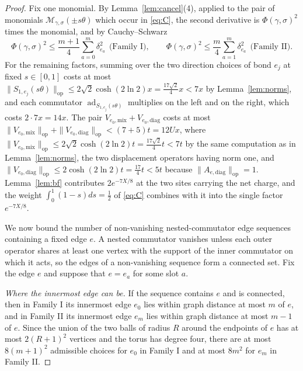 \documentclass[11pt]{article}
\theoremstyle{plain}
\theoremstyle{definition}
\newcommand{\ad}{\operatorname{ad}}
\begin{document}
\begin{proof}
Fix one monomial. By Lemma~\ref{lem:cancel}(4), applied to the pair of monomials
$\mathcal{M}_{\gamma,\sigma}(\pm s\theta)$ which occur in \eqref{eq:C}, the
second derivative is $\Phi(\gamma,\sigma)^{2}$ times the monomial, and by
Cauchy--Schwarz
\begin{equation}\label{eq:phi2}
\Phi(\gamma,\sigma)^{2}\le\frac{m+1}{4}\sum_{a=0}^{m}\delta_{e_a}^{2}
\ \ \text{(Family I)},\qquad
\Phi(\gamma,\sigma)^{2}\le\frac{m}{4}\sum_{a=1}^{m}\delta_{e_a}^{2}
\ \ \text{(Family II)} .
\end{equation}
For the remaining factors, summing over the two direction choices of bond $e_j$
at fixed $s\in[0,1]$ costs at most
$\|S_{1,e_j}(s\theta)\|_{\mathrm{op}}\le2\sqrt2\cosh(2\ln2)x=\frac{17\sqrt2}{4}x<7x$
by Lemma~\ref{lem:norms}, and each commutator $\ad_{S_{1,e_j}(s\theta)}$
multiplies on the left and on the right, which costs $2\cdot7x=14x$. The pair
$V_{e_0,\mathrm{mix}}+V_{e_0,\mathrm{diag}}$ costs at most
$\|V_{e_0,\mathrm{mix}}\|_{\mathrm{op}}+\|V_{e_0,\mathrm{diag}}\|_{\mathrm{op}}
<(7+5)t=12Ux$, where $\|V_{e_0,\mathrm{mix}}\|_{\mathrm{op}}\le2\sqrt2\cosh(2\ln2)t
=\frac{17\sqrt2}{4}t<7t$ by the same computation as in Lemma~\ref{lem:norms}, the
two displacement operators having norm one, and
$\|V_{e_0,\mathrm{diag}}\|_{\mathrm{op}}\le2\cosh(2\ln2)t=\frac{17}{4}t<5t$
because $\|A_{e,\mathrm{diag}}\|_{\mathrm{op}}=1$.
Lemma~\ref{lem:bf} contributes $2e^{-7X/8}$ at the two sites carrying the net
charge, and the weight $\int_0^{1}(1-s)ds=\frac12$ of \eqref{eq:C} combines with
it into the single factor $e^{-7X/8}$.

We now bound the number of non-vanishing nested-commutator edge sequences
containing a fixed edge $e$. A nested commutator vanishes unless each outer
operator shares at least one vertex with the support of the inner commutator on
which it acts, so the edges of a non-vanishing sequence form a connected set.
Fix the edge $e$ and suppose that $e=e_a$ for some slot $a$.

\emph{Where the innermost edge can be.} If the sequence contains $e$ and is
connected, then in Family I its innermost edge $e_0$ lies within graph distance
at most $m$ of $e$, and in Family II its innermost edge $e_m$ lies within graph
distance at most $m-1$ of $e$. Since the union of the two balls of radius $R$
around the endpoints of $e$ has at most $2(R+1)^{2}$ vertices and the torus has
degree four, there are at most $8(m+1)^{2}$ admissible choices for $e_0$ in
Family I and at most $8m^{2}$ for $e_m$ in Family II.


\end{proof}
\end{document}
